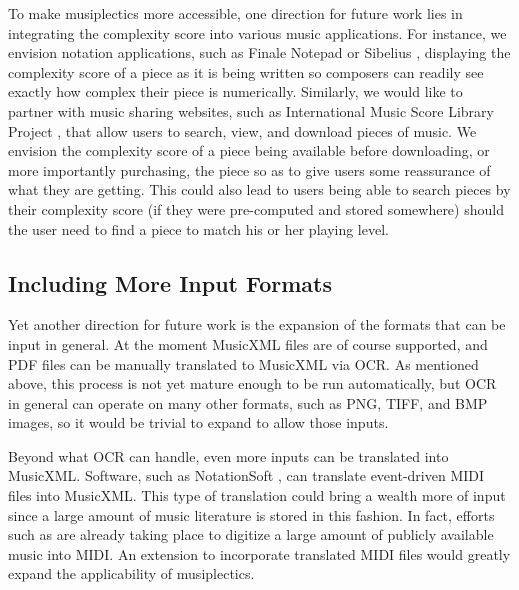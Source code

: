 \documentclass[10pt,preprint]{sigplanconf}
\begin{document}
To make musiplectics more accessible, one direction for future work lies in integrating the complexity score into various music applications. For instance, we envision notation applications, such as Finale Notepad \cite{FinaleNotepad} or Sibelius \cite{Sibelius}, displaying the complexity score of a piece as it is being written so composers can readily see exactly how complex their piece is numerically. Similarly, we would like to partner with music sharing websites, such as International Music Score Library Project \cite{IMSLP}, that allow users to search, view, and download pieces of music. We envision the complexity score of a piece being available before downloading, or more importantly purchasing, the piece so as to give users some reassurance of what they are getting. This could also lead to users being able to search pieces by their complexity score (if they were pre-computed and stored somewhere) should the user need to find a piece to match his or her playing level.



\subsection{Including More Input Formats}
\label{sec:input}

Yet another direction for future work is the expansion of the formats that can be input in general. At the moment MusicXML files are of course supported, and PDF files can be manually translated to MusicXML via OCR. As mentioned above, this process is not yet mature enough to be run automatically, but OCR in general can operate on many other formats, such as PNG, TIFF, and BMP images, so it would be trivial to expand to allow those inputs.

Beyond what OCR can handle, even more inputs can be translated into MusicXML. Software, such as NotationSoft \cite{NotationSoft}, can translate event-driven MIDI files into MusicXML. This type of translation could bring a wealth more of input since a large amount of music literature is stored in this fashion. In fact, efforts such as \cite{Choudhury2000} are already taking place to digitize a large amount of publicly available music into MIDI. An extension to incorporate translated MIDI files would greatly expand the applicability of musiplectics.
\end{document}
